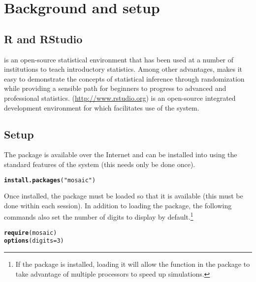 \documentclass[11pt]{article}\usepackage[]{graphicx}\usepackage[]{color}
\makeatletter
\newcommand{\hlnum}[1]{\textcolor[rgb]{0.686,0.059,0.569}{#1}}%
\newcommand{\hlstr}[1]{\textcolor[rgb]{0.192,0.494,0.8}{#1}}%
\newcommand{\hlstd}[1]{\textcolor[rgb]{0.345,0.345,0.345}{#1}}%
\newcommand{\hlkwc}[1]{\textcolor[rgb]{0.333,0.667,0.333}{#1}}%
\newcommand{\hlkwd}[1]{\textcolor[rgb]{0.737,0.353,0.396}{\textbf{#1}}}%
\newenvironment{kframe}{%
 \def\at@end@of@kframe{}%
 \ifinner\ifhmode%
  \def\at@end@of@kframe{\end{minipage}}%
  \begin{minipage}{\columnwidth}%
 \fi\fi%
 \def\FrameCommand##1{\hskip\@totalleftmargin \hskip-\fboxsep
 \colorbox{shadecolor}{##1}\hskip-\fboxsep
     \hskip-\linewidth \hskip-\@totalleftmargin \hskip\columnwidth}%
 \MakeFramed {\advance\hsize-\width
   \@totalleftmargin\z@ \linewidth\hsize
   \@setminipage}}%
 {\par\unskip\endMakeFramed%
 \at@end@of@kframe}
\newenvironment{knitrout}{}{} %
\makeatother
\begin{document}
\section{Background and setup}
\subsection{R and RStudio}
\bigskip

\R{} is an open-source statistical environment that has been used at a number
of institutions to teach introductory statistics.  Among other advantages, \R{}
makes it easy to demonstrate the concepts of statistical inference through
randomization while providing a sensible path for beginners to progress to
advanced and professional statistics. \RStudio{} (\url{http://www.rstudio.org})
is an open-source integrated development environment for \R{} which facilitates
use of the system.


\subsection{Setup}
The  package is available over the Internet and can be installed
into \R{} using the standard features of the system (this needs only be done once).  
\begin{knitrout}
\color{fgcolor}\begin{kframe}
\begin{alltt}
\hlkwd{install.packages}\hlstd{(}\hlstr{"mosaic"}\hlstd{)}
\end{alltt}
\end{kframe}
\end{knitrout}

Once installed, the package must be loaded so that it is available (this must
be done within each \R{} session).  In addition to loading the  package, 
the following commands also 
set the number of digits to display by default.\footnote{If the  package is installed, loading it will allow the  function
in the  package to take advantage of multiple processors to speed up
simulations.}

\begin{knitrout}
\color{fgcolor}\begin{kframe}
\begin{alltt}
\hlkwd{require}\hlstd{(mosaic)}
\hlkwd{options}\hlstd{(}\hlkwc{digits}\hlstd{=}\hlnum{3}\hlstd{)}
\end{alltt}
\end{kframe}
\end{knitrout}
\end{document}
